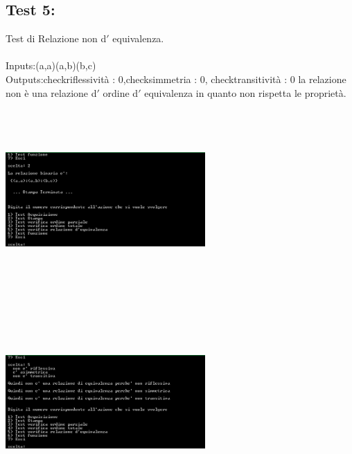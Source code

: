 \documentclass[11pt, a4paper, titlepage, block]{article}
\begin{document}
	\subsection{Test 5:}
	Test di Relazione non d$'$ equivalenza.\\
	\\
	Inputs:(a,a)(a,b)(b,c)\\
	Outputs:checkriflessivit\`a : 0,checksimmetria : 0, checktransitivit\`a : 0
	la relazione non \`e una relazione d$'$ ordine d$'$ equivalenza in quanto non rispetta le propriet\`a.\\
	\includegraphics[width=3in,height=3in,viewport=0 0 300 300]{../Screenshots/Test5Input.png}
	\\
	\includegraphics[width=3in,height=3in,viewport=0 0 300 300]{../Screenshots/Test5Output.png}
	\\
	\\
	\newpage
\end{document}
